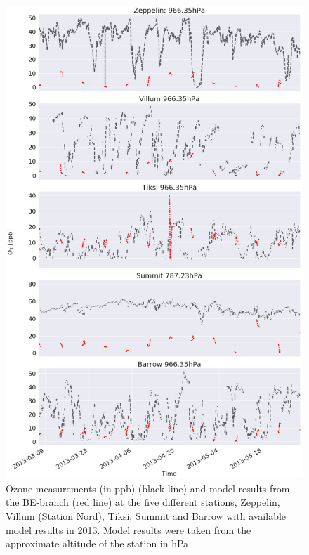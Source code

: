 \begin{figure}[h]
    \centering
    \includegraphics[width = 0.8\linewidth]{Chapter6_Results/images/ozone_stationComp_2013/ozone_2013.png}
    \caption{Ozone measurements (in ppb) (black line) and model results from the BE-branch (red line) at the five different stations, Zeppelin, Villum (Station Nord), Tiksi, Summit and Barrow with available model results in 2013. Model results were taken from the approximate altitude of the station in hPa}
    \label{fig:ozone_2013}
\end{figure}